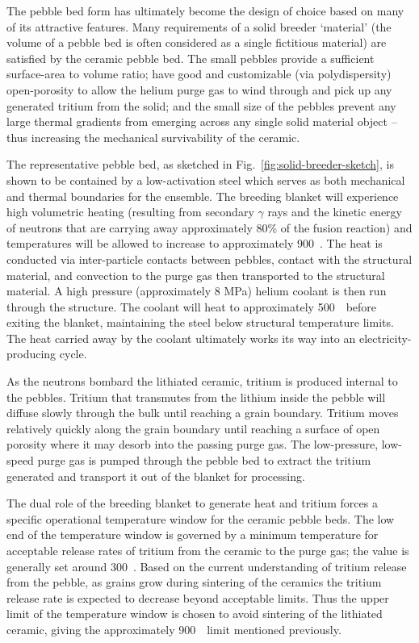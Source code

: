 The pebble bed form has ultimately become the design of choice based on many of its attractive features. Many requirements of a solid breeder `material' (the volume of a pebble bed is often considered as a single fictitious material) are satisfied by the ceramic pebble bed. The small pebbles provide a sufficient surface-area to volume ratio; have good and customizable (via polydispersity) open-porosity to allow the helium purge gas to wind through and pick up any generated tritium from the solid; and the small size of the pebbles prevent any large thermal gradients from emerging across any single solid material object -- thus increasing the mechanical survivability of the ceramic. 

The representative pebble bed, as sketched in Fig.~\ref{fig:solid-breeder-sketch}, is shown to be contained by a low-activation steel which serves as both mechanical and thermal boundaries for the ensemble. The breeding blanket will experience high volumetric heating (resulting from secondary $\gamma$ rays and the kinetic energy of neutrons that are carrying away approximately 80\% of the fusion reaction) and temperatures will be allowed to increase to approximately 900~\celsius. The heat is conducted via inter-particle contacts between pebbles, contact with the structural material, and convection to the purge gas then transported to the structural material. A high pressure (approximately 8 MPa) helium coolant is then run through the structure. The coolant will heat to approximately 500~\celsius~before exiting the blanket, maintaining the steel below structural temperature limits. The heat carried away by the coolant ultimately works its way into an electricity-producing cycle. 

As the neutrons bombard the lithiated ceramic, tritium is produced internal to the pebbles. Tritium that transmutes from the lithium inside the pebble will diffuse slowly through the bulk until reaching a grain boundary. Tritium moves relatively quickly along the grain boundary until reaching a surface of open porosity where it may desorb into the passing purge gas.\cite{Federici1990} The low-pressure, low-speed purge gas is pumped through the pebble bed to extract the tritium generated and transport it out of the blanket for processing. 

The dual role of the breeding blanket to generate heat and tritium forces a specific operational temperature window for the ceramic pebble beds. The low end of the temperature window is governed by a minimum temperature for acceptable release rates of tritium from the ceramic to the purge gas; the value is generally set around 300~\celsius. Based on the current understanding of tritium release from the pebble, as grains grow during sintering of the ceramics the tritium release rate is expected to decrease beyond acceptable limits. Thus the upper limit of the temperature window is chosen to avoid sintering of the lithiated ceramic, giving the approximately 900~\celsius~limit mentioned previously. 

